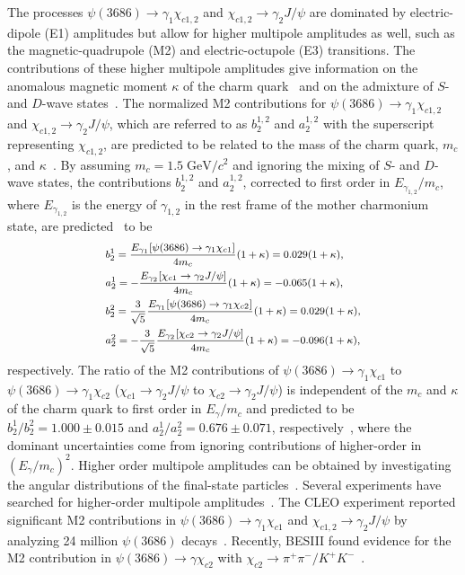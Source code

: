 \documentclass[prd,twocolumn,showpacs,amsmath,amssymb]{revtex4-1}
\begin{document}
The processes $\psi(3686)\rightarrow \gamma_{1}\chi_{c1,2}$ and $\chi_{c1,2}\rightarrow\gamma_{2}J/\psi$ are dominated by electric-dipole (E1) amplitudes
but allow for higher multipole amplitudes as well, such as the magnetic-quadrupole (M2) and electric-octupole (E3) transitions.
The contributions of these higher multipole amplitudes give information on the anomalous magnetic moment $\kappa$ of the
charm quark~\cite{M2_theory2,M2_theory1} and on the admixture of $S$- and $D$-wave states~\cite{M2_theory3}.
The normalized M2 contributions for $\psi(3686)\rightarrow\gamma_{1}\chi_{c1,2}$ and $\chi_{c1,2}\rightarrow\gamma_{2}J/\psi$,
which are referred to as $b_2^{1,2}$ and $a_2^{1,2}$ with the superscript representing $\chi_{c1,2}$, are predicted to be related to the mass of the
charm quark, $m_{c}$, and $\kappa$~\cite{M2_theory2,M2_theory1,M2_theory4}. By assuming $m_{c} = 1.5\;\text{GeV}/c^{2}$ and ignoring the mixing of $S$- and $D$-wave states,
the contributions $b_{2}^{1,2}$ and $a_{2}^{1,2}$, corrected to first order in $E_{\gamma_{1,2}}/m_c$, where $E_{\gamma_{1,2}}$ is the energy of $\gamma_{1,2}$ in the rest frame of the mother charmonium state,
are predicted~\cite{M2_theory4} to be
\begin{equation}\label{theory_predict}\footnotesize
  \begin{split}
&  b_{2}^{1} = \frac{E_{\gamma_{1}}[\psi(3686)\rightarrow\gamma_{1}\chi_{c1}]}{4m_{c}}(1+\kappa) = 0.029(1+\kappa),\\
&  a_{2}^{1} = -\frac{E_{\gamma_{2}}[\chi_{c1}\rightarrow\gamma_{2}J/\psi]}{4m_{c}}(1+\kappa) = -0.065(1+\kappa),\\
&  b_{2}^{2} = \frac{3}{\sqrt{5}}\frac{E_{\gamma_{1}}[\psi(3686)\rightarrow\gamma_{1}\chi_{c2}]}{4m_{c}}(1+\kappa) =  0.029(1+\kappa),\\
&  a_{2}^{2} = -\frac{3}{\sqrt{5}}\frac{E_{\gamma_{2}}[\chi_{c2}\rightarrow\gamma_{2}J/\psi]}{4m_{c}}(1+\kappa) = -0.096(1+\kappa),
\end{split}
\end{equation}
\noindent respectively. The ratio of the M2 contributions of $\psi(3686)\rightarrow\gamma_{1}\chi_{c1}$ to $\psi(3686)\rightarrow\gamma_{1}\chi_{c2}$
($\chi_{c1}\rightarrow\gamma_{2}J/\psi$ to $\chi_{c2}\rightarrow\gamma_{2}J/\psi$)
is independent of the $m_c$ and $\kappa$ of the charm quark to first order in $E_\gamma/m_c$ and predicted to be
$b_{2}^{1}/b_{2}^{2} = 1.000\pm0.015$ and $a_{2}^{1}/a_{2}^{2} = 0.676\pm0.071$, respectively~\cite{CLEO-c}, where the dominant uncertainties come from
ignoring contributions of higher-order in $(E_\gamma/m_c)^2$.
Higher order multipole amplitudes can be obtained by investigating the angular distributions of the final-state particles~\cite{M2_theory1,angular1,angular2}.
Several experiments have searched for higher-order multipole amplitudes~\cite{crystal_ball,E-760,E-835,BESII,CLEO-c,BESIII}.
The CLEO experiment reported significant M2 contributions in
$\psi(3686)\rightarrow\gamma_{1}\chi_{c1}$ and $\chi_{c1,2}\rightarrow\gamma_{2}J/\psi$ by analyzing 24 million $\psi(3686)$ decays~\cite{CLEO-c}.
Recently, BESIII found evidence for the M2 contribution in $\psi(3686)\rightarrow\gamma\chi_{c2}$ with
$\chi_{c2}\rightarrow\pi^{+}\pi^{-}/K^{+}K^{-}$~\cite{BESIII}.
\end{document}
